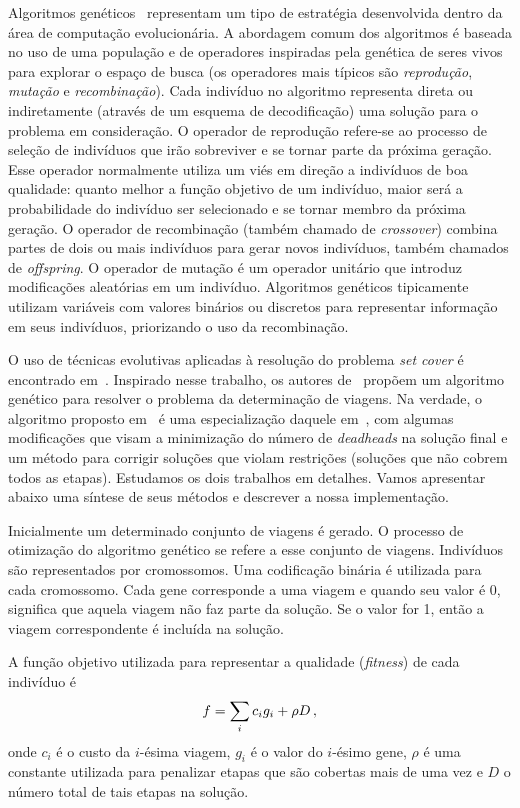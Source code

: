 Algoritmos genéticos~\cite{holland75, goldberg89} representam um tipo de estratégia desenvolvida
dentro da área de computação evolucionária. A abordagem comum dos algoritmos é baseada no uso de uma
população e de operadores inspiradas pela genética de seres vivos para explorar o espaço de busca
(os operadores mais típicos são {\it reprodução}, {\it mutação} e {\it recombinação}). Cada
indivíduo no algoritmo representa direta ou indiretamente (através de um esquema de decodificação)
uma solução para o problema em consideração. O operador de reprodução refere-se ao processo de
seleção de indivíduos que irão sobreviver e se tornar parte da próxima geração. Esse operador
normalmente utiliza um viés em direção a indivíduos de boa qualidade: quanto melhor a função
objetivo de um indivíduo, maior será a probabilidade do indivíduo ser selecionado e se tornar membro
da próxima geração. O operador de recombinação (também chamado de {\it crossover}) combina partes de
dois ou mais indivíduos para gerar novos indivíduos, também chamados de {\it offspring}. O operador
de mutação é um operador unitário que introduz modificações aleatórias em um indivíduo. Algoritmos
genéticos tipicamente utilizam variáveis com valores binários ou discretos para representar
informação em seus indivíduos, priorizando o uso da recombinação.

O uso de técnicas evolutivas aplicadas à resolução do problema {\it set cover} é encontrado
em~\cite{beasley96}. Inspirado nesse trabalho, os autores de~\cite{kornilakis02} propõem um
algoritmo genético para resolver o problema da determinação de viagens. Na verdade, o algoritmo
proposto em~\cite{kornilakis02} é uma especialização daquele em~\cite{beasley96}, com algumas
modificações que visam a minimização do número de {\it deadheads} na solução final e um método para
corrigir soluções que violam restrições (soluções que não cobrem todos as etapas). Estudamos os dois
trabalhos em detalhes. Vamos apresentar abaixo uma síntese de seus métodos e descrever a nossa
implementação.

Inicialmente um determinado conjunto de viagens é gerado. O processo de otimização do algoritmo
genético se refere a esse conjunto de viagens. Indivíduos são representados por cromossomos. Uma
codificação binária é utilizada para cada cromossomo. Cada gene corresponde a uma viagem e quando 
seu valor é 0, significa que aquela viagem não faz parte da solução. Se o valor for 1, então a 
viagem correspondente é incluída na solução.

A função objetivo utilizada para representar a qualidade ({\it fitness}) de cada indivíduo é
%
\begin{equation*}
	f = \sum_i c_i g_i + \rho D \, ,
\end{equation*}
%
onde $c_i$ é o custo da $i$-ésima viagem, $g_i$ é o valor do $i$-ésimo gene, $\rho$ é uma
constante utilizada para penalizar etapas que são cobertas mais de uma vez e $D$ o número total de
tais etapas na solução.

